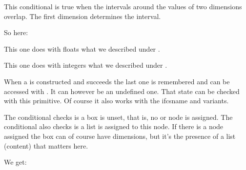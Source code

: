\startnewprimitive[title={\prm {ifintervaldim}}]

This conditional is true when the intervals around the values of two dimensions
overlap. The first dimension determines the interval.

\stopbuffer

\typebuffer

So here: \inlinebuffer

\stopnewprimitive

\startnewprimitive[title={\prm {ifintervalfloat}}]

This one does with floats what we described under .

\stopnewprimitive

\startnewprimitive[title={\prm {ifintervalnum}}]

This one does with integers what we described under .

\stopnewprimitive

\startnewprimitive[title={\prm {iflastnamedcs}}]

When a  is constructed and succeeds the last one is remembered and
can be accessed with . It can however be an undefined one. That
state can be checked with this primitive. Of course it also works with the \prm
{ifcsname} and  variants.

\stopnewprimitive

\startnewprimitive[title={\prm {iflist}}]

The  conditional checks is a box is unset, that is, no 
or  node is assigned. The  conditional also checks is a
list is assigned to this node. If there is a node assigned the box can of course
have dimensions, but it's the presence of a list (content) that matters here.

\stopbuffer

\typebuffer

We get: \inlinebuffer

\stopnewprimitive

\startnewprimitive[title={\prm {ifmathparameter}}]


